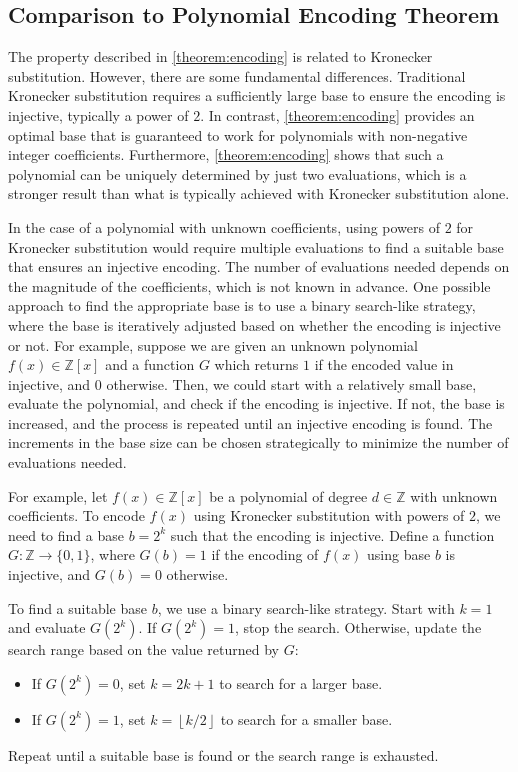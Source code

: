 \documentclass[11pt,reqno]{article}
\theoremstyle{plain}
\theoremstyle{definition}
\newcommand{\floor}[1]{\left\lfloor #1 \right\rfloor}
\begin{document}
\subsection{Comparison to Polynomial Encoding Theorem}
The property described in \cref{theorem:encoding} is related to Kronecker substitution. However, there are some fundamental differences. Traditional Kronecker substitution requires a sufficiently large base to ensure the encoding is injective, typically a power of $2$. In contrast, \cref{theorem:encoding} provides an optimal base that is guaranteed to work for polynomials with non-negative integer coefficients. Furthermore, \cref{theorem:encoding} shows that such a polynomial can be uniquely determined by just two evaluations, which is a stronger result than what is typically achieved with Kronecker substitution alone.

In the case of a polynomial with unknown coefficients, using powers of $2$ for Kronecker substitution would require multiple evaluations to find a suitable base that ensures an injective encoding. The number of evaluations needed depends on the magnitude of the coefficients, which is not known in advance. One possible approach to find the appropriate base is to use a binary search-like strategy, where the base is iteratively adjusted based on whether the encoding is injective or not. For example, suppose we are given an unknown polynomial $f(x) \in \mathbb{Z}[x]$ and a function $G$ which returns $1$ if the encoded value in injective, and $0$ otherwise. Then, we could start with a relatively small base, evaluate the polynomial, and check if the encoding is injective. If not, the base is increased, and the process is repeated until an injective encoding is found. The increments in the base size can be chosen strategically to minimize the number of evaluations needed.

For example, let $f(x) \in \mathbb{Z}[x]$ be a polynomial of degree $d \in \mathbb{Z}$ with unknown coefficients. To encode $f(x)$ using Kronecker substitution with powers of $2$, we need to find a base $b = 2^k$ such that the encoding is injective. Define a function $G: \mathbb{Z} \rightarrow \{0, 1\}$, where $G(b) = 1$ if the encoding of $f(x)$ using base $b$ is injective, and $G(b) = 0$ otherwise.

To find a suitable base $b$, we use a binary search-like strategy. Start with $k = 1$ and evaluate $G(2^k)$. If $G(2^k) = 1$, stop the search. Otherwise, update the search range based on the value returned by $G$:
\begin{itemize}
\item If $G(2^k) = 0$, set $k = 2k + 1$ to search for a larger base.
\item If $G(2^k) = 1$, set $k = \floor{k/2}$ to search for a smaller base.
\end{itemize}
Repeat until a suitable base is found or the search range is exhausted.
\end{document}
